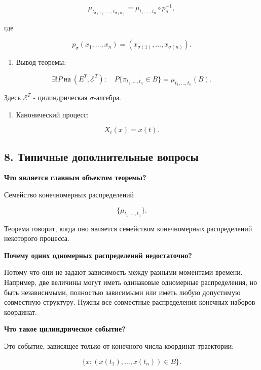 \documentclass[
  11pt,
  a4paper,
]{article}
\providecommand{\tightlist}{%
  \setlength{\itemsep}{0pt}\setlength{\parskip}{0pt}}
\begin{document}
\[
\mu_{t_{\sigma(1)},\ldots,t_{\sigma(n)}}
=
\mu_{t_1,\ldots,t_n}\circ p_\sigma^{-1},
\]

где

\[
p_\sigma(x_1,\ldots,x_n)=(x_{\sigma(1)},\ldots,x_{\sigma(n)}).
\]

\begin{enumerate}
\def\labelenumi{\arabic{enumi}.}
\setcounter{enumi}{5}
\tightlist
\item
  Вывод теоремы:
\end{enumerate}

\[
\exists!P\ \text{на}\ (E^T,\mathcal E^T):
\quad
P\{\pi_{t_1,\ldots,t_n}\in B\}
=
\mu_{t_1,\ldots,t_n}(B).
\]

Здесь \(\mathcal E^T\) - цилиндрическая \(\sigma\)-алгебра.

\begin{enumerate}
\def\labelenumi{\arabic{enumi}.}
\setcounter{enumi}{6}
\tightlist
\item
  Канонический процесс:
\end{enumerate}

\[
X_t(x)=x(t).
\]

\subsection{8. Типичные дополнительные
вопросы}\label{ux442ux438ux43fux438ux447ux43dux44bux435-ux434ux43eux43fux43eux43bux43dux438ux442ux435ux43bux44cux43dux44bux435-ux432ux43eux43fux440ux43eux441ux44b}

\textbf{Что является главным объектом теоремы?}

Семейство конечномерных распределений

\[
\{\mu_{t_1,\ldots,t_n}\}.
\]

Теорема говорит, когда оно является семейством конечномерных
распределений некоторого процесса.

\textbf{Почему одних одномерных распределений недостаточно?}

Потому что они не задают зависимость между разными моментами времени.
Например, две величины могут иметь одинаковые одномерные распределения,
но быть независимыми, полностью зависимыми или иметь любую допустимую
совместную структуру. Нужны все совместные распределения конечных
наборов координат.

\textbf{Что такое цилиндрическое событие?}

Это событие, зависящее только от конечного числа координат траектории:

\[
\{x:(x(t_1),\ldots,x(t_n))\in B\}.
\]
\end{document}
